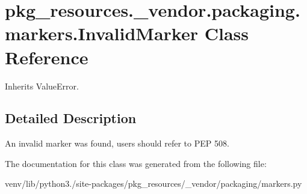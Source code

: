 \hypertarget{classpkg__resources_1_1__vendor_1_1packaging_1_1markers_1_1_invalid_marker}{}\section{pkg\+\_\+resources.\+\_\+vendor.\+packaging.\+markers.\+Invalid\+Marker Class Reference}
\label{classpkg__resources_1_1__vendor_1_1packaging_1_1markers_1_1_invalid_marker}


Inherits Value\+Error.



\subsection{Detailed Description}
\begin{DoxyVerb}An invalid marker was found, users should refer to PEP 508.
\end{DoxyVerb}
 

The documentation for this class was generated from the following file\+:\begin{DoxyCompactItemize}
\item 
venv/lib/python3./site-\/packages/pkg\+\_\+resources/\+\_\+vendor/packaging/markers.\+py\end{DoxyCompactItemize}
